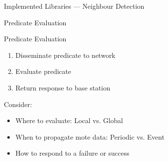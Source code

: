 \documentclass[usenames,dvipsnames]{beamer}
\newcommand{\subtitleframe}[1]{\begin{frame}\begin{block}{\centering\Large \vspace{1em} #1 \vspace{1em}}\end{block}\end{frame}}
\begin{document}
\begin{frame}{Implemented Libraries --- Neighbour Detection}
\begin{figure}[H]
\end{figure}
\end{frame}

\subtitleframe{Predicate Evaluation}

\begin{frame}{Predicate Evaluation}
	\begin{enumerate}
		\item Disseminate predicate to network
		\item Evaluate predicate
		\item Return response to base station
	\end{enumerate}
\vspace{1em}

Consider:
	\begin{itemize}
		\item Where to evaluate: Local vs. Global
		\item When to propagate mote data: Periodic vs. Event
		\item How to respond to a failure or success
	\end{itemize}
\end{frame}
\end{document}
